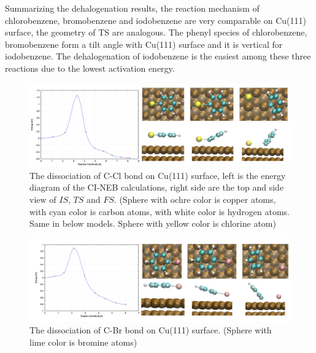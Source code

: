 \documentclass[%
 reprint,
 amsmath,amssymb,
 aps,
prb,
]{revtex4-2}
\begin{document}

Summarizing the dehalogenation results, the reaction mechanism of chlorobenzene, bromobenzene and iodobenzene are very comparable on Cu(111) surface, the geometry of TS are analogous. The phenyl species of chlorobenzene, bromobenzene form a tilt angle with Cu(111) surface and it is vertical for iodobenzene. The dehalogenation of iodobenzene is the easiest among these three reactions due to the lowest activation energy.

\begin{figure}[hbt]
\centering
\includegraphics[width=1.0\textwidth]{Fig/dissociation_Cl.png}
\caption{The dissociation of C-Cl bond on Cu(111) surface, left is the energy diagram of the CI-NEB calculations, right side are the top and side view of $IS$, $TS$ and $FS$. (Sphere with ochre color is copper atoms, with cyan color is carbon atoms, with white color is hydrogen atoms. Same in below models. Sphere with yellow color is chlorine atom)}
\label{fig:dissociation_Cl}
\end{figure}

\begin{figure}[hbt]
\centering
\includegraphics[width=1.0\textwidth]{Fig/dissociation_Br.png}
\caption{The dissociation of C-Br bond on Cu(111) surface. (Sphere with lime color is bromine atoms)}
\label{fig:dissociation_Br}
\end{figure}
\end{document}
